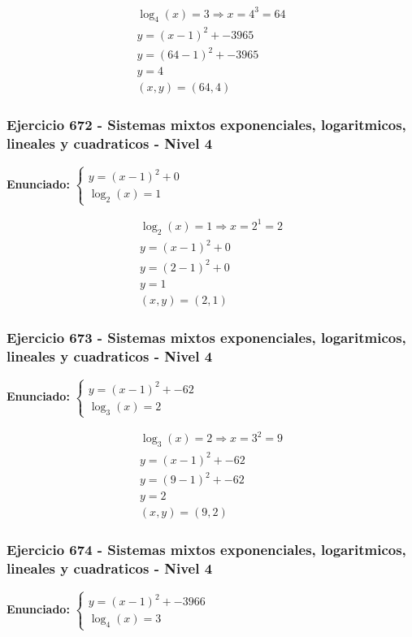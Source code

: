\documentclass[12pt,a4paper]{article}
\begin{document}
\[
\begin{aligned}
\log_{4}\left(x\right)=3\Rightarrow x=4^{3}=64\\
y=(x-1)^2+-3965\\
y=(64-1)^2+-3965\\
y=4\\
\boxed{(x,y)=(64,4)}
\end{aligned}
\]


\subsubsection*{Ejercicio 672 - Sistemas mixtos exponenciales, logaritmicos, lineales y cuadraticos - Nivel 4}
\textbf{Enunciado:} \(\begin{cases} y=(x-1)^2+0\\ \log_{2}\left(x\right)=1\end{cases}\)

\[
\begin{aligned}
\log_{2}\left(x\right)=1\Rightarrow x=2^{1}=2\\
y=(x-1)^2+0\\
y=(2-1)^2+0\\
y=1\\
\boxed{(x,y)=(2,1)}
\end{aligned}
\]


\subsubsection*{Ejercicio 673 - Sistemas mixtos exponenciales, logaritmicos, lineales y cuadraticos - Nivel 4}
\textbf{Enunciado:} \(\begin{cases} y=(x-1)^2+-62\\ \log_{3}\left(x\right)=2\end{cases}\)

\[
\begin{aligned}
\log_{3}\left(x\right)=2\Rightarrow x=3^{2}=9\\
y=(x-1)^2+-62\\
y=(9-1)^2+-62\\
y=2\\
\boxed{(x,y)=(9,2)}
\end{aligned}
\]


\subsubsection*{Ejercicio 674 - Sistemas mixtos exponenciales, logaritmicos, lineales y cuadraticos - Nivel 4}
\textbf{Enunciado:} \(\begin{cases} y=(x-1)^2+-3966\\ \log_{4}\left(x\right)=3\end{cases}\)
\end{document}
